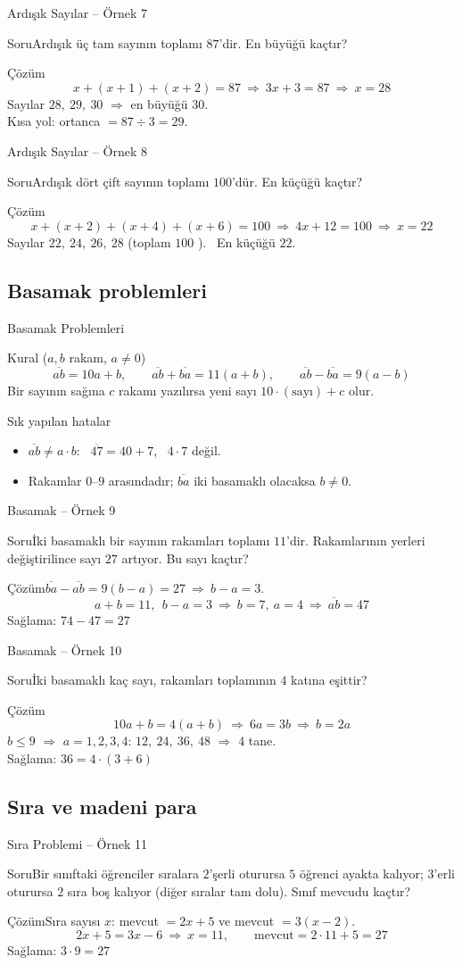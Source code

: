 \documentclass[aspectratio=169,11pt,handout]{beamer}
\newcommand{\soru}[3]{%
\begin{frame}{#1}
  \begin{block}{Soru}\large #2\end{block}
  \pause
  \begin{exampleblock}{Çözüm}\large #3\end{exampleblock}
\end{frame}}
\newcommand{\ab}[1]{\overline{#1}}
\begin{document}
\soru{Ardışık Sayılar -- Örnek 7}
{Ardışık üç tam sayının toplamı \(87\)'dir. En büyüğü kaçtır?}
{\[x+(x+1)+(x+2)=87\ \Rightarrow\ 3x+3=87\ \Rightarrow\ x=28\]
Sayılar \(28,\ 29,\ 30\) \(\Rightarrow\) en büyüğü \(30\).\\[3pt]
Kısa yol: ortanca \(=87\div 3=29\).}

\soru{Ardışık Sayılar -- Örnek 8}
{Ardışık dört çift sayının toplamı \(100\)'dür. En küçüğü kaçtır?}
{\[x+(x+2)+(x+4)+(x+6)=100\ \Rightarrow\ 4x+12=100\ \Rightarrow\ x=22\]
Sayılar \(22,\ 24,\ 26,\ 28\) \quad (toplam \(100\) \checkmark). \ En küçüğü \(22\).}

\subsection{Basamak problemleri}
\begin{frame}{Basamak Problemleri}
\begin{block}{Kural (\(a,b\) rakam, \(a\neq 0\))}
\[\ab{ab}=10a+b,\qquad \ab{ab}+\ab{ba}=11(a+b),\qquad \ab{ab}-\ab{ba}=9(a-b)\]
Bir sayının sağına \(c\) rakamı yazılırsa yeni sayı \(10\cdot(\text{sayı})+c\) olur.
\end{block}
\begin{alertblock}{Sık yapılan hatalar}
\begin{itemize}
\item \(\ab{ab}\neq a\cdot b\): \ \(\ab{47}=40+7\), \ \(4\cdot 7\) değil.
\item Rakamlar \(0\)--\(9\) arasındadır; \(\ab{ba}\) iki basamaklı olacaksa \(b\neq 0\).
\end{itemize}
\end{alertblock}
\end{frame}

\soru{Basamak -- Örnek 9}
{İki basamaklı bir sayının rakamları toplamı \(11\)'dir. Rakamlarının yerleri değiştirilince sayı \(27\) artıyor. Bu sayı kaçtır?}
{\(\ab{ba}-\ab{ab}=9(b-a)=27\ \Rightarrow\ b-a=3\).
\[a+b=11,\ \ b-a=3\ \Rightarrow\ b=7,\ a=4\ \Rightarrow\ \ab{ab}=47\]
Sağlama: \(74-47=27\) \checkmark}

\soru{Basamak -- Örnek 10}
{İki basamaklı kaç sayı, rakamları toplamının \(4\) katına eşittir?}
{\[10a+b=4(a+b)\ \Rightarrow\ 6a=3b\ \Rightarrow\ b=2a\]
\(b\le 9\) \(\Rightarrow\) \(a=1,2,3,4\): \quad \(12,\ 24,\ 36,\ 48\) \(\Rightarrow\) \(4\) tane.\\[3pt]
Sağlama: \(36=4\cdot(3+6)\) \checkmark}

\subsection{Sıra ve madeni para}
\soru{Sıra Problemi -- Örnek 11}
{Bir sınıftaki öğrenciler sıralara \(2\)'şerli oturursa \(5\) öğrenci ayakta kalıyor; \(3\)'erli oturursa \(2\) sıra boş kalıyor (diğer sıralar tam dolu). Sınıf mevcudu kaçtır?}
{Sıra sayısı \(x\): \quad mevcut \(=2x+5\) \quad ve \quad mevcut \(=3(x-2)\).
\[2x+5=3x-6\ \Rightarrow\ x=11,\qquad \text{mevcut}=2\cdot 11+5=27\]
Sağlama: \(3\cdot 9=27\) \checkmark}
\end{document}
